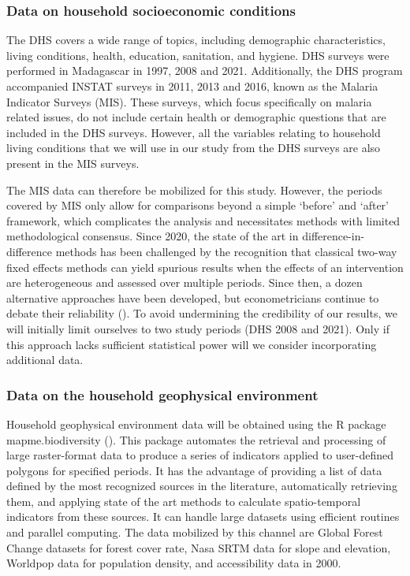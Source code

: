 \documentclass[
]{article}
\begin{document}
\subsubsection{Data on household socioeconomic
conditions}\label{data-on-household-socioeconomic-conditions}

The DHS covers a wide range of topics, including demographic
characteristics, living conditions, health, education, sanitation, and
hygiene. DHS surveys were performed in Madagascar in 1997, 2008 and
2021. Additionally, the DHS program accompanied INSTAT surveys in 2011,
2013 and 2016, known as the Malaria Indicator Surveys (MIS). These
surveys, which focus specifically on malaria related issues, do not
include certain health or demographic questions that are included in the
DHS surveys. However, all the variables relating to household living
conditions that we will use in our study from the DHS surveys are also
present in the MIS surveys.

The MIS data can therefore be mobilized for this study. However, the
periods covered by MIS only allow for comparisons beyond a simple
`before' and `after' framework, which complicates the analysis and
necessitates methods with limited methodological consensus. Since 2020,
the state of the art in difference-in-difference methods has been
challenged by the recognition that classical two-way fixed effects
methods can yield spurious results when the effects of an intervention
are heterogeneous and assessed over multiple periods. Since then, a
dozen alternative approaches have been developed, but econometricians
continue to debate their reliability
(). To avoid
undermining the credibility of our results, we will initially limit
ourselves to two study periods (DHS 2008 and 2021). Only if this
approach lacks sufficient statistical power will we consider
incorporating additional data.

\subsubsection{Data on the household geophysical
environment}\label{data-on-the-household-geophysical-environment}

Household geophysical environment data will be obtained using the R
package mapme.biodiversity (). This package automates the retrieval and processing
of large raster-format data to produce a series of indicators applied to
user-defined polygons for specified periods. It has the advantage of
providing a list of data defined by the most recognized sources in the
literature, automatically retrieving them, and applying state of the art
methods to calculate spatio-temporal indicators from these sources. It
can handle large datasets using efficient routines and parallel
computing. The data mobilized by this channel are Global Forest Change
datasets for forest cover rate, Nasa SRTM data for slope and elevation,
Worldpop data for population density, and accessibility data in 2000.
\end{document}
